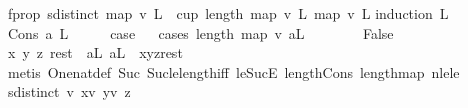 \begin{isabellebody}
\endisatagproof
{\isafoldproof}%
%
\isadelimproof
\isanewline
%
\endisadelimproof
{}\isamarkupfalse%
\ f{\isacharunderscore}{\kern0pt}prop{}{}{\isacharcolon}{\kern0pt}\ {\isachardoublequoteopen}sdistinct\ {\isacharparenleft}{\kern0pt}map\ v{}\ L{\isacharparenright}{\kern0pt}\ {\isasymLongrightarrow}\ cup\ {\isacharparenleft}{\kern0pt}length\ {\isacharparenleft}{\kern0pt}map\ v{}\ L{\isacharparenright}{\kern0pt}{\isacharparenright}{\kern0pt}\ {\isacharparenleft}{\kern0pt}map\ v{}\ L{\isacharparenright}{\kern0pt}{\isachardoublequoteclose}\isanewline
%
\isadelimproof
%
\endisadelimproof
%
\isatagproof
{}\isamarkupfalse%
{\isacharparenleft}{\kern0pt}induction\ L{\isacharparenright}{\kern0pt}\isanewline
\ \ \isamarkupfalse%
\ {\isacharparenleft}{\kern0pt}Cons\ a\ L{\isacharparenright}{\kern0pt}\isanewline
\ \ \isamarkupfalse%
\ \isamarkupfalse%
\ {\isacharquery}{\kern0pt}case\isanewline
\ \ \isamarkupfalse%
{\isacharparenleft}{\kern0pt}cases\ {\isachardoublequoteopen}length\ {\isacharparenleft}{\kern0pt}map\ v{}\ {\isacharparenleft}{\kern0pt}a{\isacharhash}{\kern0pt}L{\isacharparenright}{\kern0pt}{\isacharparenright}{\kern0pt}\ {\isasymle}\ {}{\isachardoublequoteclose}{\isacharparenright}{\kern0pt}\isanewline
\ \ \ \ \isamarkupfalse%
\ False\isanewline
\ \ \ \ \isamarkupfalse%
\ \isamarkupfalse%
\ x\ y\ z\ rest\ \ aL{\isacharcolon}{\kern0pt}\ {\isachardoublequoteopen}a{\isacharhash}{\kern0pt}L\ {\isacharequal}{\kern0pt}\ x{\isacharhash}{\kern0pt}y{\isacharhash}{\kern0pt}z{\isacharhash}{\kern0pt}rest{\isachardoublequoteclose}\isanewline
\ \ \ \ \ \ \isamarkupfalse%
\ {\isacharparenleft}{\kern0pt}metis\ One{\isacharunderscore}{\kern0pt}nat{\isacharunderscore}{\kern0pt}def\ Suc{\isacharunderscore}{\kern0pt}{}\ Suc{\isacharunderscore}{\kern0pt}le{\isacharunderscore}{\kern0pt}length{\isacharunderscore}{\kern0pt}iff\ le{\isacharunderscore}{\kern0pt}SucE\ length{\isacharunderscore}{\kern0pt}Cons\ length{\isacharunderscore}{\kern0pt}map\ nle{\isacharunderscore}{\kern0pt}le{\isacharparenright}{\kern0pt}\isanewline
\ \ \ \ \isamarkupfalse%
\ {\isachardoublequoteopen}sdistinct\ {\isacharbrackleft}{\kern0pt}v{}\ x{\isacharcomma}{\kern0pt}v{}\ y{\isacharcomma}{\kern0pt}v{}\ z{\isacharbrackright}{\kern0pt}{\isachardoublequoteclose}\ \isanewline

\end{isabellebody}
